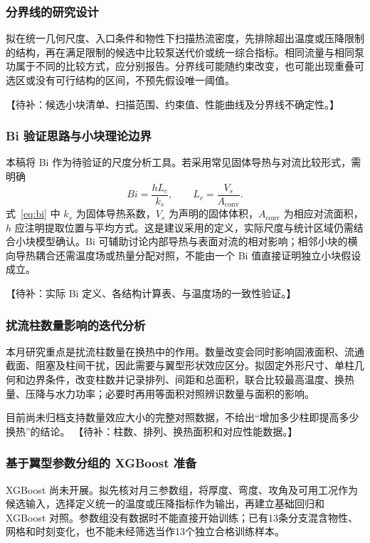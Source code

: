 \documentclass[stage2,fontset=fandol]{ydzjreport}
\begin{document}
\subsubsection{分界线的研究设计}
拟在统一几何尺度、入口条件和物性下扫描热流密度，先排除超出温度或压降限制的结构，再在满足限制的候选中比较泵送代价或统一综合指标。相同流量与相同泵功属于不同的比较方式，应分别报告。分界线可能随约束改变，也可能出现重叠可选区或没有可行结构的区间，不预先假设唯一阈值。

【待补：候选小块清单、扫描范围、约束值、性能曲线及分界线不确定性。】

\subsubsection{Bi 验证思路与小块理论边界}
本稿将 Bi 作为待验证的尺度分析工具。若采用常见固体导热与对流比较形式，需明确
\begin{equation}
Bi=\frac{hL_c}{k_s},\qquad L_c=\frac{V_s}{A_{\mathrm{conv}}}.
\label{eq:bi}
\end{equation}
式~\eqref{eq:bi} 中 $k_s$ 为固体导热系数，$V_s$ 为声明的固体体积，$A_{\mathrm{conv}}$ 为相应对流面积，$h$ 应注明提取位置与平均方式。这是建议采用的定义，实际尺度与统计区域仍需结合小块模型确认。Bi 可辅助讨论内部导热与表面对流的相对影响；相邻小块的横向导热耦合还需温度场或热量分配对照，不能由一个 Bi 值直接证明独立小块假设成立。

【待补：实际 Bi 定义、各结构计算表、与温度场的一致性验证。】

\subsubsection{扰流柱数量影响的迭代分析}
本月研究重点是扰流柱数量在换热中的作用。数量改变会同时影响固液面积、流通截面、阻塞及柱间干扰，因此需要与翼型形状效应区分。拟固定外形尺寸、单柱几何和边界条件，改变柱数并记录排列、间距和总面积，联合比较最高温度、换热量、压降与水力功率；必要时再用等面积对照辨识数量与面积的影响。

目前尚未归档支持数量效应大小的完整对照数据，不给出“增加多少柱即提高多少换热”的结论。
【待补：柱数、排列、换热面积和对应性能数据。】

\subsubsection{基于翼型参数分组的 XGBoost 准备}
XGBoost 尚未开展。拟先核对月三参数组，将厚度、弯度、攻角及可用工况作为候选输入，选择定义统一的温度或压降指标作为输出，再建立基础回归和 XGBoost 对照。参数组没有数据时不能直接开始训练；已有13条分支混含物性、网格和时刻变化，也不能未经筛选当作13个独立合格训练样本。
\end{document}
